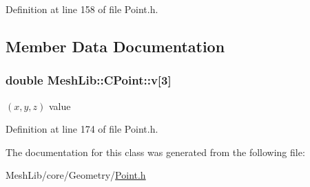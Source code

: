 Definition at line 158 of file Point.\+h.



\subsection{Member Data Documentation}
\subsubsection[{\texorpdfstring{v}{v}}]{\setlength{\rightskip}{0pt plus 5cm}double Mesh\+Lib\+::\+C\+Point\+::v\mbox{[}3\mbox{]}\hspace{0.3cm}{\ttfamily [protected]}}\hypertarget{class_mesh_lib_1_1_c_point_aabfccf1912d5b44eab72f6f2e5bf3b12}{}\label{class_mesh_lib_1_1_c_point_aabfccf1912d5b44eab72f6f2e5bf3b12}
$(x,y,z)$ value 

Definition at line 174 of file Point.\+h.



The documentation for this class was generated from the following file\+:\begin{DoxyCompactItemize}
\item 
Mesh\+Lib/core/\+Geometry/\hyperlink{_point_8h}{Point.\+h}\end{DoxyCompactItemize}
